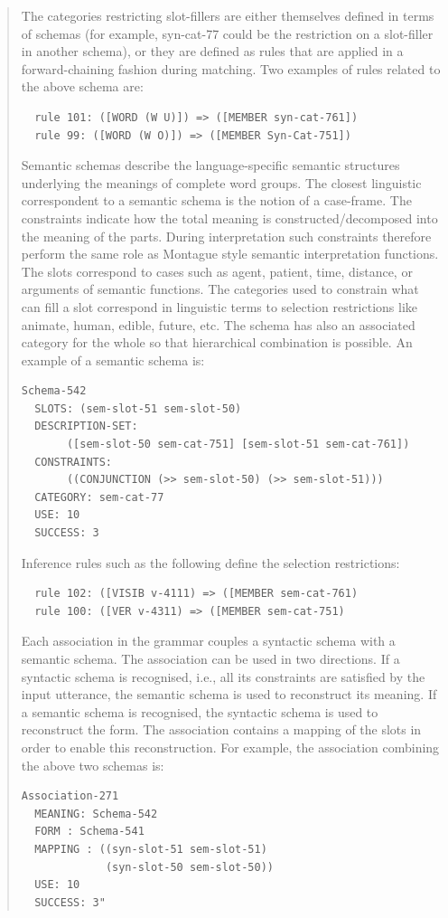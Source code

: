 \begin{quote}
The categories restricting slot-fillers are either themselves defined in terms of schemas
(for example, syn-cat-77 could be the restriction on a slot-filler in another schema), or they
are defined as rules that are applied in a forward-chaining fashion during matching. Two
examples of rules related to the above schema are:
\begin{verbatim}
  rule 101: ([WORD (W U)]) => ([MEMBER syn-cat-761])
  rule 99: ([WORD (W O)]) => ([MEMBER Syn-Cat-751])
\end{verbatim}
Semantic schemas describe the language-specific semantic structures underlying the
meanings of complete word groups. The closest linguistic correspondent to a semantic
schema is the notion of a case-frame. The constraints indicate how the total meaning
is constructed/decomposed into the meaning of the parts. During interpretation such
constraints therefore perform the same role as Montague style semantic interpretation
functions. The slots correspond to cases such as agent, patient, time, distance, or arguments
of semantic functions. The categories used to constrain what can fill a slot correspond
in linguistic terms to selection restrictions like animate, human, edible, future, etc. The
schema has also an associated category for the whole so that hierarchical combination is
possible. An example of a semantic schema is:
\clearpage
\begin{verbatim}
Schema-542
  SLOTS: (sem-slot-51 sem-slot-50)
  DESCRIPTION-SET: 
       ([sem-slot-50 sem-cat-751] [sem-slot-51 sem-cat-761])
  CONSTRAINTS: 
       ((CONJUNCTION (>> sem-slot-50) (>> sem-slot-51)))
  CATEGORY: sem-cat-77
  USE: 10
  SUCCESS: 3
\end{verbatim}


Inference rules such as the following define the selection restrictions:
\begin{verbatim}
  rule 102: ([VISIB v-4111) => ([MEMBER sem-cat-761)
  rule 100: ([VER v-4311) => ([MEMBER sem-cat-751)
\end{verbatim}
Each association in the grammar couples a syntactic schema with a semantic schema.
The association can be used in two directions. If a syntactic schema is recognised, i.e., all its 
constraints are satisfied by the input utterance, the semantic schema is
used to reconstruct its meaning. If a semantic schema is recognised, the syntactic schema
is used to reconstruct the form. The association contains a mapping of the slots in order to
enable this reconstruction. For example, the association combining the above two schemas is: 
\begin{verbatim}
Association-271
  MEANING: Schema-542
  FORM : Schema-541
  MAPPING : ((syn-slot-51 sem-slot-51)
             (syn-slot-50 sem-slot-50))
  USE: 10
  SUCCESS: 3"
\end{verbatim}
\end{quote}

